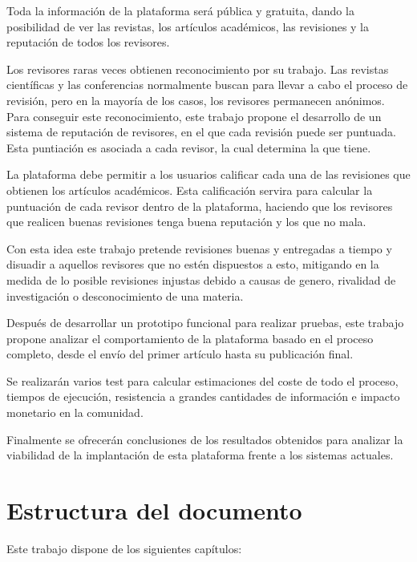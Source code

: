 Toda la información de la plataforma será pública y gratuita, dando la
posibilidad de ver las revistas, los artículos académicos, las revisiones
y la reputación de todos los revisores.


Los revisores raras veces obtienen reconocimiento por su trabajo. Las revistas
científicas y las conferencias normalmente buscan  para llevar
a cabo el proceso de revisión, pero en la mayoría de los casos, los revisores permanecen anónimos. Para
conseguir este reconocimiento, este trabajo propone el desarrollo de un sistema
de reputación de revisores, en el que cada revisión puede ser puntuada. Esta
puntiación es asociada a cada revisor, la cual determina la  que
tiene.

La plataforma debe permitir a los usuarios calificar cada una de las revisiones
que obtienen los artículos académicos. Esta calificación servira para calcular
la puntuación de cada revisor dentro de la plataforma, haciendo que los
revisores que realicen buenas revisiones tenga buena reputación y los que no
mala.

Con esta idea este trabajo pretende  revisiones buenas y entregadas
a tiempo y disuadir a aquellos revisores que no estén dispuestos a esto,
mitigando en la medida de lo posible revisiones injustas debido a causas de
genero, rivalidad de investigación o desconocimiento de una materia.


Después de desarrollar un prototipo funcional para realizar pruebas, este
trabajo propone analizar el comportamiento de la plataforma basado en el proceso
completo, desde el envío del primer artículo hasta su publicación
final.

Se realizarán varios  test para calcular estimaciones del coste de todo el
proceso, tiempos de ejecución, resistencia a grandes cantidades de información e
impacto monetario en la comunidad.

Finalmente se ofrecerán conclusiones de los resultados obtenidos para analizar
la viabilidad de la implantación de esta plataforma frente a los sistemas
actuales.


\section{Estructura del documento}
Este trabajo dispone de los siguientes capítulos:


